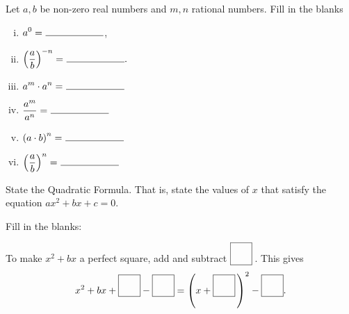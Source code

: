 \documentclass[12pt]{amsart}
\begin{document}
\begin{thm}[6 Points]\label{ex2}
  Let $a, b$ be non-zero real numbers and $m, n$ rational numbers.
  Fill in the blanks
  \begin{multicols}{2}
    \begin{enumerate}[(i)]
    \item
      $\displaystyle{a^0 =\ \line(1,0){60}}$,
      \vspace{.15in}
    \item
      $\displaystyle{\left(\frac{a}{b}\right)^{-n} =\ \line(1,0){60}}.$
      \vspace{.15in}
    \item
      $\displaystyle{a^m \cdot a^n =\ \line(1,0){60}}$
      \vspace{.15in}
    \item
      $\displaystyle{\frac{a^m}{a^n} =\ \line(1,0){60}}$
      \vspace{.15in}
    \item
      $\displaystyle{\left(a \cdot b\right)^n =\ \line(1,0){60}}$
      \vspace{.15in}
    \item
      $\displaystyle{\left(\frac{a}{b}\right)^n =\ \line(1,0){60}}$
    \end{enumerate}
  \end{multicols}
\end{thm}

\begin{thm}[1 Points]\label{ex3}
  State the Quadratic Formula.
  That is, state the values of $x$ that satisfy the equation $ax^2 + bx + c = 0$.
  \vspace{1in}
\end{thm}

\begin{thm}[1 Points]\label{ex4}
  Fill in the blanks:\\
  \begin{center}
    To make $x^2 + bx$ a perfect square, add and subtract $\fbox{\raisebox{16px}{\hspace{16px}}}$\,.
    This gives
    $$x^2 + bx + \fbox{\raisebox{16px}{\hspace{16px}}} - \fbox{\raisebox{16px}{\hspace{16px}}} = \left(x + \fbox{\raisebox{16px}{\hspace{16px}}}\,\right)^2 - \fbox{\raisebox{16px}{\hspace{16px}}}.$$
  \end{center}
\end{thm}
\end{document}
